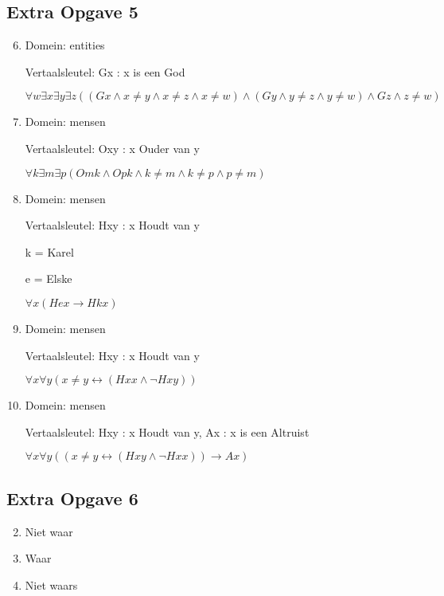 \documentclass[11pt]{article}
\newcommand{\E}{\exists}
\newcommand{\A}{\forall}
\begin{document}
\subsection*{Extra Opgave 5}
\begin{enumerate}[label=\alph*]
  \setcounter{enumi}{5}
  \item Domein: entities

  Vertaalsleutel: Gx : x is een God

  $\A w \E x \E y \E z
  ((Gx \wedge x \neq y \wedge x \neq z \wedge x \neq w) \wedge
  (Gy \wedge y \neq z \wedge y \neq w) \wedge
  Gz \wedge z \neq w)$

  \setcounter{enumi}{8}
  \item Domein: mensen

  Vertaalsleutel: Oxy : x Ouder van y

  $\A k \E m \E p (Omk \wedge Opk \wedge k \neq m \wedge k \neq p \wedge p \neq m)$

  \setcounter{enumi}{12}
  \item Domein: mensen

  Vertaalsleutel: Hxy : x Houdt van y

  k = Karel

  e = Elske

  $\A x (Hex \rightarrow Hkx)$

  \setcounter{enumi}{17}
  \item Domein: mensen

  Vertaalsleutel: Hxy : x Houdt van y

  $\A x \A y(x \neq y \leftrightarrow (Hxx \wedge \neg Hxy))$

  \setcounter{enumi}{18}
  \item Domein: mensen

  Vertaalsleutel: Hxy : x Houdt van y, Ax : x is een Altruist

  $\A x \A y((x \neq y \leftrightarrow (Hxy \wedge \neg Hxx)) \rightarrow Ax)$

\end{enumerate}


\subsection*{Extra Opgave 6}
\begin{enumerate}[label=\roman*]
  \setcounter{enumi}{1}
  \item Niet waar

  \setcounter{enumi}{3}
  \item Waar

  \setcounter{enumi}{5}
  \item Niet waars

\end{enumerate}
\end{document}
